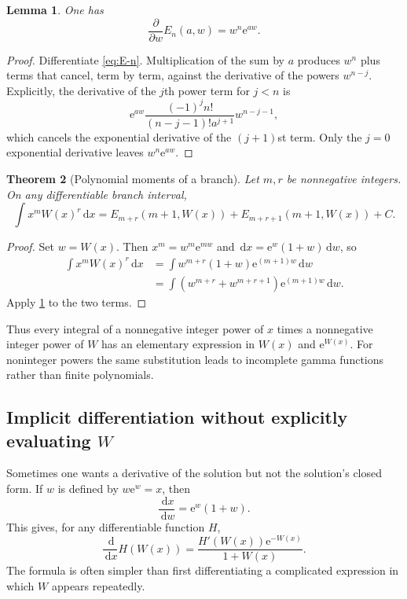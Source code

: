 \documentclass[11pt]{article}
\numberwithin{equation}{section}
\newtheorem{theorem}{Theorem}[section]
\newtheorem{lemma}[theorem]{Lemma}
\theoremstyle{definition}
\theoremstyle{remark}
\newcommand{\e}{\mathrm e}
\newcommand{\dd}{\,\mathrm d}
\begin{document}
\begin{lemma}
\label{lem:E-n}
One has
\begin{equation}
  \frac{\partial}{\partial w}E_n(a,w)=w^n\e^{aw}.     \label{eq:E-n-derivative}
\end{equation}
\end{lemma}

\begin{proof}
Differentiate \eqref{eq:E-n}.  Multiplication of the sum by $a$ produces
$w^n$ plus terms that cancel, term by term, against the derivative of the
powers $w^{n-j}$.  Explicitly, the derivative of the $j$th power term for
$j<n$ is
\[
 \e^{aw}\frac{(-1)^j n!}{(n-j-1)!a^{j+1}}w^{n-j-1},
\]
which cancels the exponential derivative of the $(j+1)$st term.  Only the
$j=0$ exponential derivative leaves $w^n\e^{aw}$.
\end{proof}

\begin{theorem}[Polynomial moments of a branch]
\label{thm:W-polynomial-moments}
Let $m,r$ be nonnegative integers.  On any differentiable branch interval,
\begin{equation}
 \int x^m W(x)^r\dd x
 =E_{m+r}(m+1,W(x))+E_{m+r+1}(m+1,W(x))+C.             \label{eq:W-moment-integral}
\end{equation}
\end{theorem}

\begin{proof}
Set $w=W(x)$.  Then
$x^m=w^m\e^{mw}$ and
$\dd x=\e^w(1+w)\dd w$, so
\begin{align*}
 \int x^mW(x)^r\dd x
 &=\int w^{m+r}(1+w)\e^{(m+1)w}\dd w\\
 &=\int\left(w^{m+r}+w^{m+r+1}\right)\e^{(m+1)w}\dd w.
\end{align*}
Apply \cref{lem:E-n} to the two terms.
\end{proof}

Thus every integral of a nonnegative integer power of $x$ times a
nonnegative integer power of $W$ has an elementary expression in
$W(x)$ and $\e^{W(x)}$.  For noninteger powers the same substitution leads to
incomplete gamma functions rather than finite polynomials.

\subsection{Implicit differentiation without explicitly evaluating \texorpdfstring{$W$}{W}}

Sometimes one wants a derivative of the solution but not the solution's
closed form.  If $w$ is defined by $w\e^w=x$, then
\[
 \frac{\dd x}{\dd w}=\e^w(1+w).
\]
This gives, for any differentiable function $H$,
\begin{equation}
 \frac{\dd}{\dd x}H(W(x))
 =\frac{H'(W(x))\e^{-W(x)}}{1+W(x)}.                  \label{eq:composition-derivative}
\end{equation}
The formula is often simpler than first differentiating a complicated
expression in which $W$ appears repeatedly.
\end{document}
